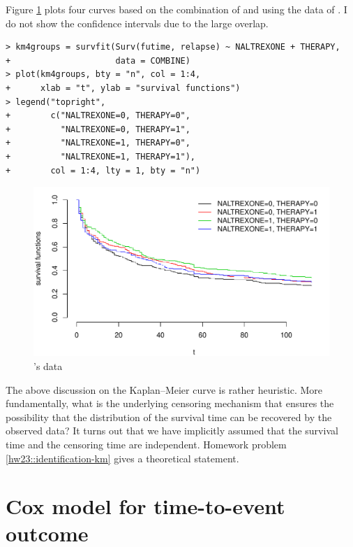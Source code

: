 Figure \ref{fig::kmcurve2x2-lin} plots four curves based on the combination of  and   using the data of \citet{lin2016simultaneous}. I do not show the confidence intervals due to the large overlap. 

\begin{lstlisting}
> km4groups = survfit(Surv(futime, relapse) ~ NALTREXONE + THERAPY,
+                     data = COMBINE)
> plot(km4groups, bty = "n", col = 1:4,
+      xlab = "t", ylab = "survival functions")
> legend("topright",
+        c("NALTREXONE=0, THERAPY=0", 
+          "NALTREXONE=0, THERAPY=1", 
+          "NALTREXONE=1, THERAPY=0", 
+          "NALTREXONE=1, THERAPY=1"),
+        col = 1:4, lty = 1, bty = "n")
\end{lstlisting}



\begin{figure}[th]
\centering
\includegraphics[width = \textwidth]{figures/KMcurve2x2.pdf}
\caption{\citet{lin2016simultaneous}'s data}\label{fig::kmcurve2x2-lin}
\end{figure}




The above discussion on the Kaplan--Meier curve is rather heuristic. More fundamentally, what is the underlying censoring mechanism that ensures the possibility that the distribution of the survival time can be recovered by the observed data? It turns out that we have implicitly assumed that the survival time and the censoring time are independent. Homework problem \ref{hw23::identification-km} gives a theoretical statement. 



\section{Cox model for time-to-event outcome}



